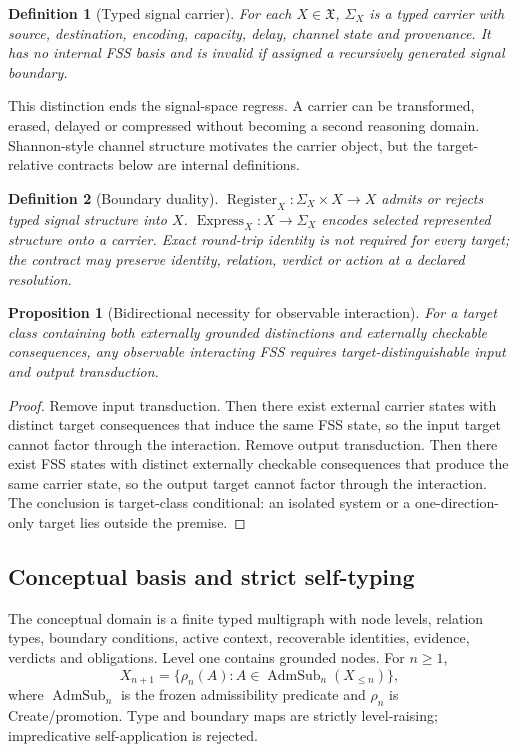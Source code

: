 \documentclass[10pt]{article}
\newtheorem{definition}{Definition}
\newtheorem{proposition}{Proposition}
\newcommand{\Reg}{\operatorname{Register}}
\newcommand{\Exp}{\operatorname{Express}}
\begin{document}
\begin{definition}[Typed signal carrier]
For each $X\in\mathfrak X$, $\Sigma_X$ is a typed carrier with source, destination, encoding, capacity, delay, channel state and provenance. It has no internal FSS basis and is invalid if assigned a recursively generated signal boundary.
\end{definition}

This distinction ends the signal-space regress. A carrier can be transformed, erased, delayed or compressed without becoming a second reasoning domain. Shannon-style channel structure motivates the carrier object, but the target-relative contracts below are internal definitions\citep{shannon1948,cover2006}.

\begin{definition}[Boundary duality]
$\Reg_X:\Sigma_X\times X\rightarrow X$ admits or rejects typed signal structure into $X$. $\Exp_X:X\rightarrow\Sigma_X$ encodes selected represented structure onto a carrier. Exact round-trip identity is not required for every target; the contract may preserve identity, relation, verdict or action at a declared resolution.
\end{definition}

\begin{proposition}[Bidirectional necessity for observable interaction]
For a target class containing both externally grounded distinctions and externally checkable consequences, any observable interacting FSS requires target-distinguishable input and output transduction.
\end{proposition}
\begin{proof}
Remove input transduction. Then there exist external carrier states with distinct target consequences that induce the same FSS state, so the input target cannot factor through the interaction. Remove output transduction. Then there exist FSS states with distinct externally checkable consequences that produce the same carrier state, so the output target cannot factor through the interaction. The conclusion is target-class conditional: an isolated system or a one-direction-only target lies outside the premise.
\end{proof}

\subsection{Conceptual basis and strict self-typing}
The conceptual domain is a finite typed multigraph with node levels, relation types, boundary conditions, active context, recoverable identities, evidence, verdicts and obligations. Level one contains grounded nodes. For $n\geq1$,
\begin{equation}
X_{n+1}=\{\rho_n(A):A\in\operatorname{AdmSub}_n(X_{\leq n})\},
\end{equation}
where $\operatorname{AdmSub}_n$ is the frozen admissibility predicate and $\rho_n$ is Create/promotion. Type and boundary maps are strictly level-raising; impredicative self-application is rejected.
\end{document}
